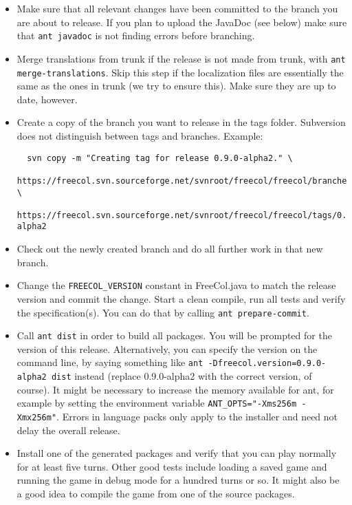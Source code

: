 \documentclass[12pt]{book}
\begin{document}
\begin{itemize}

\item Make sure that all relevant changes have been committed to the
  branch you are about to release.  If you plan to upload the JavaDoc
  (see below) make sure that \verb+ant javadoc+ is not finding errors
  before branching.

\item Merge translations from trunk if the release is not made from
  trunk, with \verb+ant merge-translations+. Skip this step if the
  localization files are essentially the same as the ones in trunk (we
  try to ensure this). Make sure they are up to date, however.

\item Create a copy of the branch you want to release in the tags
  folder. Subversion does not distinguish between tags and
  branches. Example:

{\small
\begin{verbatim}
  svn copy -m "Creating tag for release 0.9.0-alpha2." \
  https://freecol.svn.sourceforge.net/svnroot/freecol/freecol/branches/0.9.x \
  https://freecol.svn.sourceforge.net/svnroot/freecol/freecol/tags/0.9.0-alpha2
\end{verbatim}
}

\item Check out the newly created branch and do all further work in that
  new branch.

\item Change the \verb$FREECOL_VERSION$ constant in FreeCol.java to
  match the release version and commit the change. Start a clean
  compile, run all tests and verify the specification(s). You can do
  that by calling \verb+ant prepare-commit+.

\item Call \verb+ant dist+ in order to build all packages. You will be
  prompted for the version of this release. Alternatively, you can
  specify the version on the command line, by saying something like
  \verb+ant -Dfreecol.version=0.9.0-alpha2 dist+ instead (replace
  0.9.0-alpha2 with the correct version, of course). It might be
  necessary to increase the memory available for ant, for example by
  setting the environment variable
  \verb+ANT_OPTS="-Xms256m -Xmx256m"+.  Errors in language packs only
  apply to the installer and need not delay the overall release.

\item Install one of the generated packages and verify that you can play
  normally for at least five turns. Other good tests include loading a
  saved game and running the game in debug mode for a hundred turns or
  so. It might also be a good idea to compile the game from one of the
  source packages.


\end{itemize}
\end{document}
